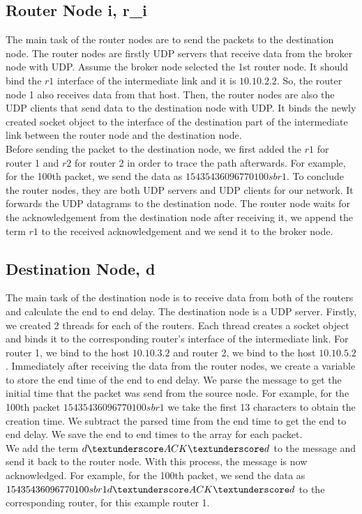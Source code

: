\documentclass[conference]{IEEEtran}
\begin{document}
\subsection{Router Node i, \textbf{r_i}}
The main task of the router nodes are to send the packets to the destination node. The router nodes are firstly UDP servers that receive data from the broker node with UDP. Assume the broker node selected the 1st router node. It should bind the $r1$ interface of the intermediate link and it is $10.10.2.2$. So, the router node 1 also receives data from that host. Then, the router nodes are also the UDP clients that send data to the destination node with UDP. It binds the newly created socket object to the interface of the destination part of the intermediate link between the router node and the destination node. \\
Before sending the packet to the destination node, we first added the $r1$ for router 1 and $r2$ for router 2 in order to trace the path afterwards. For example, for the 100th packet, we send the data as $15435436096770100sbr1$. To conclude the router nodes, they are both UDP servers and UDP clients for our network. It forwards the UDP datagrams to the destination node. The router node waits for the acknowledgement from the destination node after receiving it, we append the term $r1$ to the received acknowledgement and we send it to the broker node.

\subsection{Destination Node, \textbf{d}}
The main task of the destination node is to receive data from both of the routers and calculate the end to end delay. The destination node is a UDP server. Firstly, we created 2 threads for each of the routers. Each thread creates a socket object and binds it to the corresponding router's interface of the intermediate link. For router 1, we bind to the host $10.10.3.2$ and router 2, we bind to the host $10.10.5.2$. Immediately after receiving the data from the router nodes, we create a variable to store the end time of the end to end delay. We parse the message to get the initial time that the packet was send from the source node. For example, for the 100th packet $15435436096770100sbr1$ we take the first 13 characters to obtain the creation time. We subtract the parsed time from the end time to get the end to end delay. We save the end to end times to the array for each packet. \\
We add the term $d\textunderscore ACK\textunderscore d$ to the message and send it back to the router node. With this process, the message is now acknowledged. For example, for the 100th packet, we send the data as $15435436096770100sbr1d\textunderscore ACK\textunderscore d$ to the corresponding router, for this example router 1.
\end{document}
